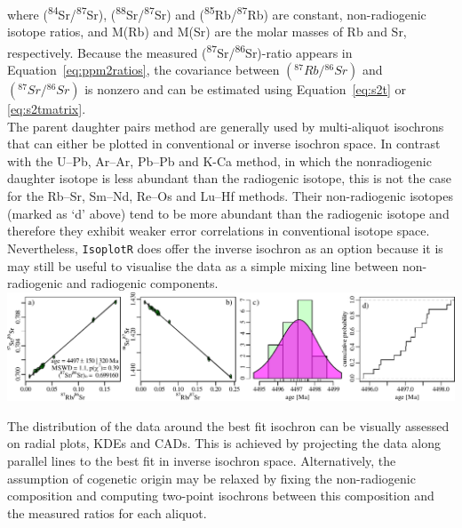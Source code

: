 \begin{refsection}
\noindent where (\textsuperscript{84}Sr/\textsuperscript{87}Sr),
(\textsuperscript{88}Sr/\textsuperscript{87}Sr) and
(\textsuperscript{85}Rb/\textsuperscript{87}Rb) are constant,
non-radiogenic isotope ratios, and M(Rb) and M(Sr) are the molar
masses of Rb and Sr, respectively. Because the measured
(\textsuperscript{87}Sr/\textsuperscript{86}Sr)-ratio appears in
Equation~\ref{eq:ppm2ratios}, the covariance between
$({}^{87}Rb/{}^{86}Sr)$ and $({}^{87}Sr/{}^{86}Sr)$ is nonzero and can
be estimated using Equation~\ref{eq:s2t} or \ref{eq:s2tmatrix}.\\

The parent daughter pairs method are generally used by multi-aliquot
isochrons that can either be plotted in conventional or inverse
isochron space. In contrast with the U--Pb, Ar--Ar, Pb--Pb and K-Ca
method, in which the nonradiogenic daughter isotope is less abundant
than the radiogenic isotope, this is not the case for the Rb--Sr,
Sm--Nd, Re--Os and Lu--Hf methods. Their non-radiogenic isotopes
(marked as `d' above) tend to be more abundant than the radiogenic
isotope and therefore they exhibit weaker error correlations in
conventional isotope space. Nevertheless, \texttt{IsoplotR} does offer
the inverse isochron as an option because it is may still be useful to
visualise the data as a simple mixing line between non-radiogenic and
radiogenic components.\\

\noindent\includegraphics[width=\textwidth]{../figures/RbSr.pdf}
\begingroup{}
\label{fig:RbSrabcd}\endgroup

The distribution of the data around the best fit isochron can be
visually assessed on radial plots, KDEs and CADs. This is achieved by
projecting the data along parallel lines to the best fit in inverse
isochron space. Alternatively, the assumption of cogenetic origin may
be relaxed by fixing the non-radiogenic composition and computing
two-point isochrons between this composition and the measured ratios
for each aliquot.

\printbibliography[heading=subbibliography]

\end{refsection}
